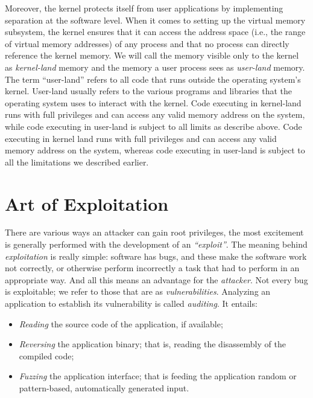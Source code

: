 \documentclass{masterthesis}
\begin{document}
Moreover, the kernel protects itself from user applications by implementing separation at the software level. When it comes to setting up the virtual memory subsystem, the kernel ensures that it can access the address space (i.e., the range of virtual memory addresses) of any process and that no process can directly reference the kernel memory. 
We will call the memory visible only to the kernel as \emph{kernel-land} memory and the memory a user process sees as \emph{user-land} memory. The term ``user-land'' refers to all code that runs outside the operating system's kernel. User-land usually refers to the various programs and libraries that the operating system uses to interact with the kernel.
Code executing in kernel-land runs with full privileges and can access any valid memory address on the system, while code executing in user-land is subject to all limits as describe above.
Code executing in kernel land runs with full privileges and can access any valid memory address on the system, whereas code executing in user-land is subject to all the limitations we described earlier.


\chapter{Art of Exploitation}
\label{ch:exploitation}

There are various ways an attacker can gain root privileges, the most excitement is generally performed with the development of an \emph{``exploit''}.
The meaning behind \emph{exploitation} is really simple: software has bugs, and these make the software work not correctly, or otherwise perform incorrectly a task that had to perform in an appropriate way.
And all this means an advantage for the \emph{attacker}. Not every bug is exploitable; we refer to those that are as \emph{vulnerabilities}.
Analyzing an application to establish its vulnerability is called \emph{auditing}. It entails:
\begin{itemize}
\item \emph{Reading} the source code of the application, if available;
\item \emph{Reversing} the application binary; that is, reading the disassembly of the compiled code;
\item \emph{Fuzzing} the application interface; that is feeding the application random or pattern-based, automatically generated input.
\end{itemize}
\end{document}
